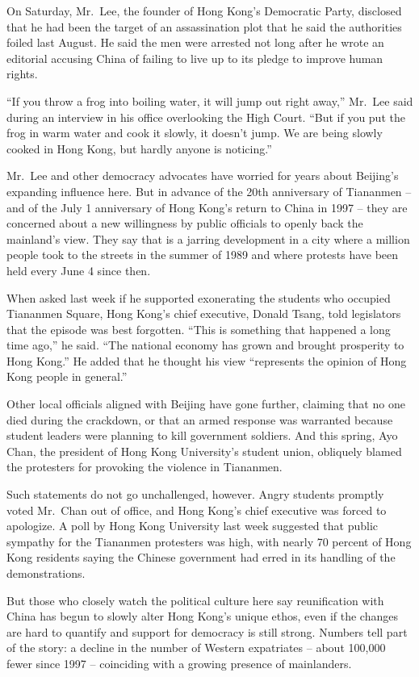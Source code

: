 \documentclass[12pt,a4paper,onecolumn]{article}
\begin{document}
On Saturday, Mr.~Lee, the founder of Hong Kong's Democratic Party, disclosed that he had been the
target of an assassination plot that he said the authorities foiled last August. He said the men
were arrested not long after he wrote an editorial accusing China of failing to live up to its
pledge to improve human rights.

``If you throw a frog into boiling water, it will jump out right away,'' Mr.~Lee said during an
interview in his office overlooking the High Court. ``But if you put the frog in warm water and cook
it slowly, it doesn't jump. We are being slowly cooked in Hong Kong, but hardly anyone is
noticing.''

Mr.~Lee and other democracy advocates have worried for years about Beijing's expanding influence
here. But in advance of the 20th anniversary of Tiananmen -- and of the July 1 anniversary of Hong
Kong's return to China in 1997 -- they are concerned about a new willingness by public officials to
openly back the mainland's view. They say that is a jarring development in a city where a million
people took to the streets in the summer of 1989 and where protests have been held every June 4
since then.

When asked last week if he supported exonerating the students who occupied Tiananmen Square, Hong
Kong's chief executive, Donald Tsang, told legislators that the episode was best forgotten. ``This
is something that happened a long time ago,'' he said. ``The national economy has grown and brought
prosperity to Hong Kong.'' He added that he thought his view ``represents the opinion of Hong Kong
people in general.''

Other local officials aligned with Beijing have gone further, claiming that no one died during the
crackdown, or that an armed response was warranted because student leaders were planning to kill
government soldiers. And this spring, Ayo Chan, the president of Hong Kong University's student
union, obliquely blamed the protesters for provoking the violence in Tiananmen.

Such statements do not go unchallenged, however. Angry students promptly voted Mr.~Chan out of
office, and Hong Kong's chief executive was forced to apologize. A poll by Hong Kong University last
week suggested that public sympathy for the Tiananmen protesters was high, with nearly 70 percent of
Hong Kong residents saying the Chinese government had erred in its handling of the demonstrations.

But those who closely watch the political culture here say reunification with China has begun to
slowly alter Hong Kong's unique ethos, even if the changes are hard to quantify and support for
democracy is still strong. Numbers tell part of the story: a decline in the number of Western
expatriates -- about 100,000 fewer since 1997 -- coinciding with a growing presence of mainlanders.
\end{document}
